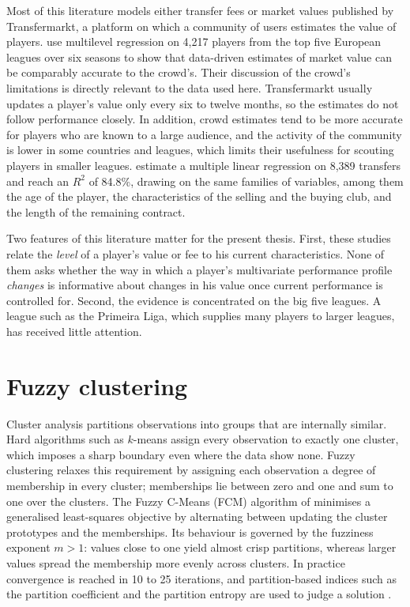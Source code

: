 Most of this literature models either transfer fees or market values published by Transfermarkt, a platform on which a community of users estimates the value of players.  use multilevel regression on 4,217 players from the top five European leagues over six seasons to show that data-driven estimates of market value can be comparably accurate to the crowd's. Their discussion of the crowd's limitations is directly relevant to the data used here. Transfermarkt usually updates a player's value only every six to twelve months, so the estimates do not follow performance closely. In addition, crowd estimates tend to be more accurate for players who are known to a large audience, and the activity of the community is lower in some countries and leagues, which limits their usefulness for scouting players in smaller leagues.  estimate a multiple linear regression on 8,389 transfers and reach an $R^2$ of 84.8\%, drawing on the same families of variables, among them the age of the player, the characteristics of the selling and the buying club, and the length of the remaining contract.

Two features of this literature matter for the present thesis. First, these studies relate the \emph{level} of a player's value or fee to his current characteristics. None of them asks whether the way in which a player's multivariate performance profile \emph{changes} is informative about changes in his value once current performance is controlled for. Second, the evidence is concentrated on the big five leagues. A league such as the Primeira Liga, which supplies many players to larger leagues, has received little attention.

\section{Fuzzy clustering}
\label{sec:lit-fuzzy}

Cluster analysis partitions observations into groups that are internally similar. Hard algorithms such as $k$-means assign every observation to exactly one cluster, which imposes a sharp boundary even where the data show none. Fuzzy clustering relaxes this requirement by assigning each observation a degree of membership in every cluster; memberships lie between zero and one and sum to one over the clusters. The Fuzzy C-Means (FCM) algorithm of  minimises a generalised least-squares objective by alternating between updating the cluster prototypes and the memberships. Its behaviour is governed by the fuzziness exponent $m>1$: values close to one yield almost crisp partitions, whereas larger values spread the membership more evenly across clusters. In practice convergence is reached in 10 to 25 iterations, and partition-based indices such as the partition coefficient and the partition entropy are used to judge a solution \cite{bezdek1984fcm}.

